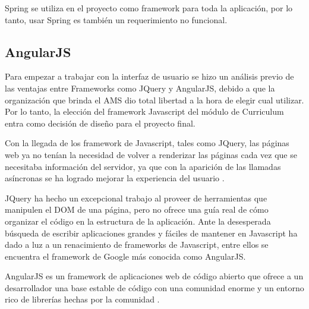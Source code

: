 Spring se utiliza en el proyecto como framework para toda la aplicación, por lo tanto, usar Spring es también un requerimiento no funcional.

\subsection{AngularJS}
Para empezar a trabajar con la interfaz de usuario se hizo un análisis previo de las ventajas entre Frameworks como JQuery y AngularJS, debido a que la organización que brinda el AMS dio total libertad a la hora de elegir cual utilizar. Por lo tanto, la elección del framework Javascript del módulo de Curriculum entra como decisión de diseño para el proyecto final. 

Con la llegada de los framework de Javascript, tales como JQuery, las páginas web ya no tenían la necesidad de volver a renderizar las páginas cada vez que se necesitaba información del servidor, ya que con la aparición de las llamadas asíncronas se ha logrado mejorar la experiencia del usuario \citep{ruebbelke2015angularjs}.

JQuery ha hecho un excepcional trabajo al proveer de herramientas que manipulen el DOM de una página, pero no ofrece una guía real de cómo organizar el código en la estructura de la aplicación. Ante la desesperada búsqueda de escribir aplicaciones grandes y fáciles de mantener en Javascript ha dado a luz a un renacimiento de frameworks de Javascript, entre ellos se encuentra el framework de Google más conocida como AngularJS.

AngularJS es un framework de aplicaciones web de código abierto que ofrece a un desarrollador una base estable de código con una comunidad enorme y un entorno rico de librerías hechas por la comunidad \citep{darwin2013angularjs}.